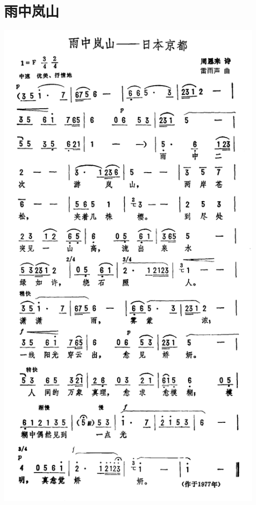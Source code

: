 \documentclass[cn,pad,chinese,chinesefont=nofont]{elegantbook}
\begin{document}
\section{雨中岚山}
    \includegraphics[height=\textheight]{dongxiao/日本-雨中岚山.png}
\end{document}

